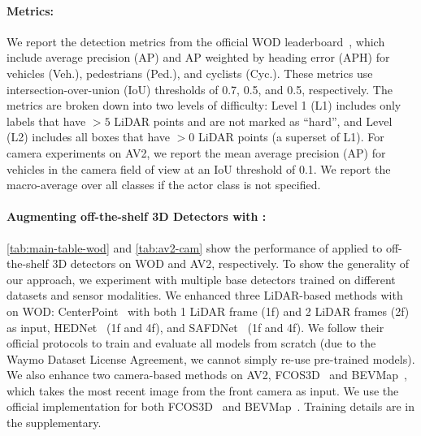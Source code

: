 

\paragraph{Metrics:}

We report the detection metrics from the official WOD leaderboard~\cite{WOD},
which include average precision (AP) and AP weighted
by heading error (APH) for vehicles (Veh.), pedestrians (Ped.), and cyclists (Cyc.).
These metrics use intersection-over-union (IoU) thresholds
of 0.7, 0.5, and 0.5, respectively.
The metrics are broken down into two levels of difficulty:
Level 1 (L1) includes only labels that have $> 5$ LiDAR points
and are not marked as ``hard'',
and Level (L2) includes all boxes that have $> 0$ LiDAR points (a superset of L1).
For camera experiments on AV2, we report the mean average precision (AP) for vehicles in the camera field of view at an IoU threshold of 0.1.
We report the macro-average over all classes if the actor class is not specified.





\paragraph{Augmenting off-the-shelf 3D Detectors with \ourmodel{}:}
\cref{tab:main-table-wod} and \cref{tab:av2-cam} show the performance of \ourmodel{} applied to off-the-shelf 3D detectors on WOD and AV2, respectively.%
To show the generality of our approach, we experiment with multiple base detectors trained on different datasets and sensor modalities.
We enhanced three LiDAR-based methods with \ourmodel{} on WOD:
CenterPoint~\cite{centerpoint}
with both 1 LiDAR frame (1f) and 2 LiDAR frames (2f) as input,
HEDNet~\cite{hednet} (1f and 4f),
and SAFDNet~\cite{safdnet} (1f and 4f).
We follow their official protocols to train and evaluate all models from scratch (due to the Waymo Dataset License Agreement,
we cannot simply re-use pre-trained models).
We also enhance two camera-based methods on AV2, FCOS3D~\cite{wang2021fcos3d}
and BEVMap~\cite{chang2024bevmap},
which takes the most recent image from the front camera as input.
We use the official implementation for both FCOS3D~\cite{wang2021fcos3d} and BEVMap~\cite{chang2024bevmap}. Training details are in the supplementary.

